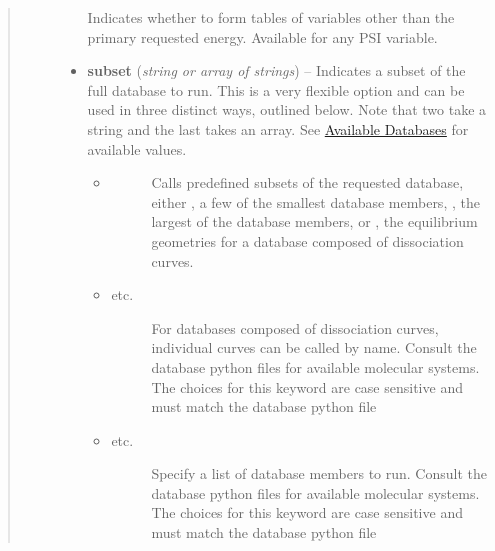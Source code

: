 \documentclass[letterpaper,10pt,english]{sphinxmanual}
\begin{document}
\begin{fulllineitems}
\begin{quote}
\begin{description}
\begin{itemize}
Indicates whether to form tables of variables other than the
primary requested energy.  Available for any PSI variable.


\item {} 
\textbf{subset} (\emph{string or array of strings}) -- 
Indicates a subset of the full database to run. This is a very
flexible option and can be used in three distinct ways, outlined
below. Note that two take a string and the last takes an array.
See {\hyperref[index:available-databases]{Available Databases}} for available values.
\begin{itemize}
\item {} \begin{description}
\item[{ \textbar{}\textbar{}  \textbar{}\textbar{} }] \leavevmode
Calls predefined subsets of the requested database, either
, a few of the smallest database members,
, the largest of the database members, or
, the equilibrium geometries for a database
composed of dissociation curves.

\end{description}

\item {} \begin{description}
\item[{ \textbar{}\textbar{}  \textbar{}\textbar{}  \textbar{}\textbar{} etc.}] \leavevmode
For databases composed of dissociation curves, individual
curves can be called by name. Consult the database python
files for available molecular systems.  The choices for this
keyword are case sensitive and must match the database python file

\end{description}

\item {} \begin{description}
\item[{\code{{[}1,2,5{]}} \textbar{}\textbar{} \code{{[}'1','2','5'{]}} \textbar{}\textbar{}  \textbar{}\textbar{} etc.}] \leavevmode
Specify a list of database members to run. Consult the
database python files for available molecular systems.  The
choices for this keyword are case sensitive and must match the
database python file

\end{description}


\end{itemize}
\end{itemize}
\end{description}
\end{quote}
\end{fulllineitems}
\end{document}
